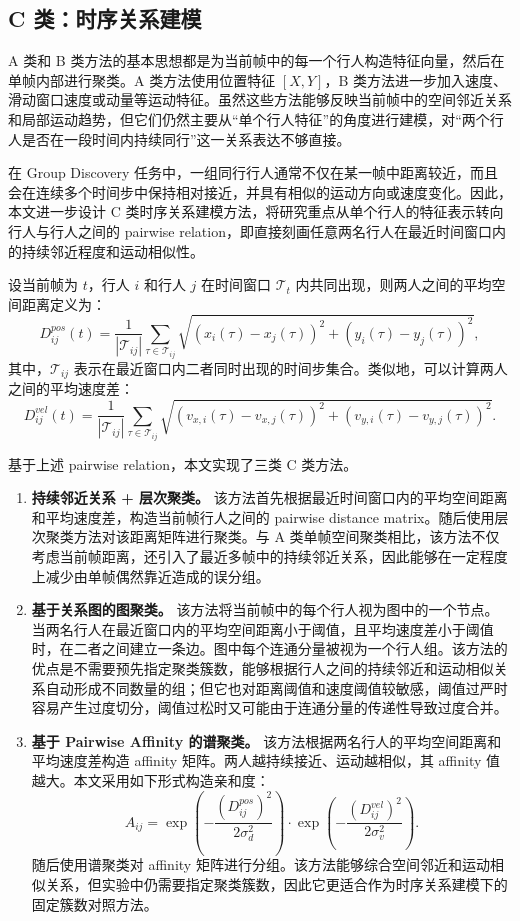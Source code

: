\documentclass[UTF8,a4paper,12pt]{ctexart}
\begin{document}
\subsection{C 类：时序关系建模}

A 类和 B 类方法的基本思想都是为当前帧中的每一个行人构造特征向量，然后在单帧内部进行聚类。A 类方法使用位置特征 $[X,Y]$，B 类方法进一步加入速度、滑动窗口速度或动量等运动特征。虽然这些方法能够反映当前帧中的空间邻近关系和局部运动趋势，但它们仍然主要从“单个行人特征”的角度进行建模，对“两个行人是否在一段时间内持续同行”这一关系表达不够直接。

在 Group Discovery 任务中，一组同行行人通常不仅在某一帧中距离较近，而且会在连续多个时间步中保持相对接近，并具有相似的运动方向或速度变化。因此，本文进一步设计 C 类时序关系建模方法，将研究重点从单个行人的特征表示转向行人与行人之间的 pairwise relation，即直接刻画任意两名行人在最近时间窗口内的持续邻近程度和运动相似性。

设当前帧为 $t$，行人 $i$ 和行人 $j$ 在时间窗口 $\mathcal{T}_t$ 内共同出现，则两人之间的平均空间距离定义为：
\[
D_{ij}^{pos}(t)=\frac{1}{|\mathcal{T}_{ij}|}
\sum_{\tau\in\mathcal{T}_{ij}}
\sqrt{(x_i(\tau)-x_j(\tau))^2+(y_i(\tau)-y_j(\tau))^2},
\]
其中，$\mathcal{T}_{ij}$ 表示在最近窗口内二者同时出现的时间步集合。类似地，可以计算两人之间的平均速度差：
\[
D_{ij}^{vel}(t)=\frac{1}{|\mathcal{T}_{ij}|}
\sum_{\tau\in\mathcal{T}_{ij}}
\sqrt{(v_{x,i}(\tau)-v_{x,j}(\tau))^2+(v_{y,i}(\tau)-v_{y,j}(\tau))^2}.
\]

基于上述 pairwise relation，本文实现了三类 C 类方法。

\begin{enumerate}
    \item \textbf{持续邻近关系 + 层次聚类。}
    该方法首先根据最近时间窗口内的平均空间距离和平均速度差，构造当前帧行人之间的 pairwise distance matrix。随后使用层次聚类方法对该距离矩阵进行聚类。与 A 类单帧空间聚类相比，该方法不仅考虑当前帧距离，还引入了最近多帧中的持续邻近关系，因此能够在一定程度上减少由单帧偶然靠近造成的误分组。

    \item \textbf{基于关系图的图聚类。}
    该方法将当前帧中的每个行人视为图中的一个节点。当两名行人在最近窗口内的平均空间距离小于阈值，且平均速度差小于阈值时，在二者之间建立一条边。图中每个连通分量被视为一个行人组。该方法的优点是不需要预先指定聚类簇数，能够根据行人之间的持续邻近和运动相似关系自动形成不同数量的组；但它也对距离阈值和速度阈值较敏感，阈值过严时容易产生过度切分，阈值过松时又可能由于连通分量的传递性导致过度合并。

    \item \textbf{基于 Pairwise Affinity 的谱聚类。}
    该方法根据两名行人的平均空间距离和平均速度差构造 affinity 矩阵。两人越持续接近、运动越相似，其 affinity 值越大。本文采用如下形式构造亲和度：
    \[
    A_{ij}=
    \exp\left(-\frac{(D_{ij}^{pos})^2}{2\sigma_d^2}\right)
    \cdot
    \exp\left(-\frac{(D_{ij}^{vel})^2}{2\sigma_v^2}\right).
    \]
    随后使用谱聚类对 affinity 矩阵进行分组。该方法能够综合空间邻近和运动相似关系，但实验中仍需要指定聚类簇数，因此它更适合作为时序关系建模下的固定簇数对照方法。
\end{enumerate}
\end{document}
